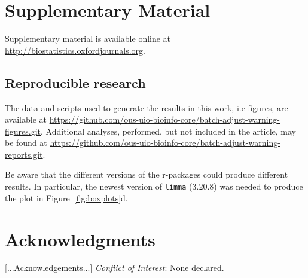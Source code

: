 \documentclass{bio}
\begin{document}
\section{Supplementary Material}
\label{supp}

Supplementary material is available online at
\href{http://biostatistics.oxfordjournals.org}%
{http://biostatistics.oxfordjournals.org}.


\subsection{Reproducible research}

The data and scripts used to generate the results in this work, i.e figures, are available at
\href{https://github.com/ous-uio-bioinfo-core/batch-adjust-warning-figures.git}{https://github.com/ous-uio-bioinfo-core/batch-adjust-warning-figures.git}.
Additional analyses, performed, but not included in the article, may be found at
\href{https://github.com/ous-uio-bioinfo-core/batch-adjust-warning-reports.git}{https://github.com/ous-uio-bioinfo-core/batch-adjust-warning-reports.git}.

Be aware that the different versions of the r-packages could produce different results. In particular, the newest version of \texttt{limma} (3.20.8) was needed to produce the plot in Figure~\ref{fig:boxplots}d.


\section*{Acknowledgments}

[...Acknowledgements...]
{\it Conflict of Interest}: None declared.



%


\end{document}
